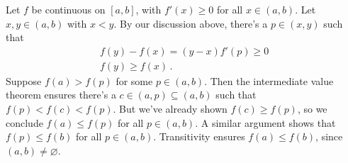 \documentclass{article}
\begin{document}
Let $f$ be continuous on $[a,b]$, with $f'(x) \geq 0$ for all $x \in (a,b)$.
Let $x, y \in (a,b)$ with $x < y$. By our discussion above, there's a $p \in (x,y)$
such that
\begin{gather*}
    f(y) - f(x) = (y-x)f'(p) \geq 0 \\
    f(y) \geq f(x) \,.
\end{gather*}
Suppose $f(a) > f(p)$ for some $p \in (a,b)$. Then the intermediate
value theorem ensures there's a $c \in (a, p) \subseteq (a,b)$ such that $f(p) < f(c) < f(p)$.
But we've already shown $f(c) \geq f(p)$, so we conclude $f(a) \leq f(p)$
for all $p \in (a,b)$. A similar argument shows that
$f(p) \leq f(b)$ for all $p \in (a,b)$.
Transitivity ensures $f(a) \leq f(b)$, since $(a,b) \neq \varnothing$.

\qedsymbol
\end{document}
